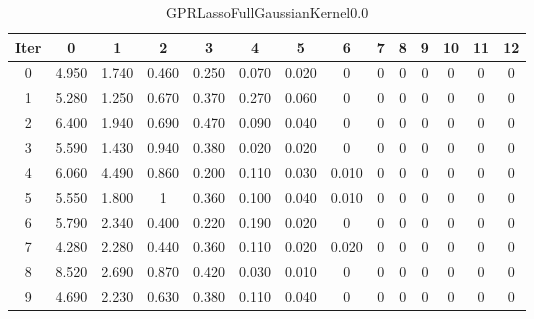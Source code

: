 \begin{table}
	\begin{center}
		\begin{tabular}{|c|c|c|c|c|c|c|c|c|c|c|c|c|c|}
			\hline
			Iter & 0 & 1 & 2 & 3 & 4 & 5 & 6 & 7 & 8 & 9 & 10 & 11 & 12 \\
			\hline
			0 & 4.950 & 1.740 & 0.460 & 0.250 & 0.070 & 0.020 & 0 & 0 & 0 & 0 & 0 & 0 & 0 \\
			\hline
			1 & 5.280 & 1.250 & 0.670 & 0.370 & 0.270 & 0.060 & 0 & 0 & 0 & 0 & 0 & 0 & 0 \\
			\hline
			2 & 6.400 & 1.940 & 0.690 & 0.470 & 0.090 & 0.040 & 0 & 0 & 0 & 0 & 0 & 0 & 0 \\
			\hline
			3 & 5.590 & 1.430 & 0.940 & 0.380 & 0.020 & 0.020 & 0 & 0 & 0 & 0 & 0 & 0 & 0 \\
			\hline
			4 & 6.060 & 4.490 & 0.860 & 0.200 & 0.110 & 0.030 & 0.010 & 0 & 0 & 0 & 0 & 0 & 0 \\
			\hline
			5 & 5.550 & 1.800 & 1 & 0.360 & 0.100 & 0.040 & 0.010 & 0 & 0 & 0 & 0 & 0 & 0 \\
			\hline
			6 & 5.790 & 2.340 & 0.400 & 0.220 & 0.190 & 0.020 & 0 & 0 & 0 & 0 & 0 & 0 & 0 \\
			\hline
			7 & 4.280 & 2.280 & 0.440 & 0.360 & 0.110 & 0.020 & 0.020 & 0 & 0 & 0 & 0 & 0 & 0 \\
			\hline
			8 & 8.520 & 2.690 & 0.870 & 0.420 & 0.030 & 0.010 & 0 & 0 & 0 & 0 & 0 & 0 & 0 \\
			\hline
			9 & 4.690 & 2.230 & 0.630 & 0.380 & 0.110 & 0.040 & 0 & 0 & 0 & 0 & 0 & 0 & 0 \\
			\hline
		\end{tabular}
	\end{center}
	\caption{GPRLassoFullGaussianKernel0.0}
\end{table}